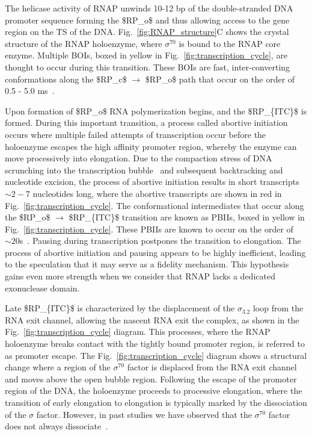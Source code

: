 The helicase activity of RNAP unwinds 10-12 \ac{bp} of the double-stranded DNA promoter sequence forming the \ac{$RP_o$} and thus allowing access to the gene region on the \ac{TS} of the DNA. 
Fig.~\ref{fig:RNAP_structure}C shows the crystal structure of the RNAP holoenzyme, where $\sigma^{70}$ is bound to the RNAP core enzyme. 
Multiple \ac{BOIs}, boxed in yellow in Fig.~\ref{fig:transcription_cycle}, are thought to occur during this transition. 
These \ac{BOIs} are fast, inter-converting conformations along the \ac{$RP_c$} $\rightarrow$ \ac{$RP_o$} path that occur on the order of 0.5 - 5.0 ms~\cite{lerner_JCP_2018, robb_JMB_2013}.

Upon formation of \ac{$RP_o$} RNA polymerization begins, and the \ac{$RP_{ITC}$} is formed.
During this important transition, a process called abortive initiation occurs where multiple failed attempts of transcription occur before the holoenzyme escapes the high affinity promoter region, whereby the enzyme can move processively into elongation. 
Due to the compaction stress of DNA scrunching into the transcription bubble~\cite{kapanidis_science_2006} and subsequent backtracking and nucleotide excision, the process of abortive initiation results in short transcripts $\sim2-7$ nucleotides long, where the abortive transcripts are shown in red in Fig.~\ref{fig:transcription_cycle}.
The conformational intermediates that occur along the \ac{$RP_o$}  $\rightarrow$ \ac{$RP_{ITC}$} transition are known as \ac{PBIIs}, boxed in yellow in Fig.~\ref{fig:transcription_cycle}. 
These \ac{PBIIs} are known to occur on the order of $\sim20$s~\cite{kapanidis_science_2006,lerner_PNAS_2016,lerner_transcription_2017}.
Pausing during transcription postpones the transition to elongation.
The process of abortive initiation and pausing appears to be highly inefficient, leading to the speculation that it may serve as a fidelity mechanism. 
This hypothesis gains even more strength when we consider that RNAP lacks a dedicated exonuclease domain.

Late \ac{$RP_{ITC}$} is characterized by the displacement of the $\sigma_{3.2}$ loop from the RNA exit channel, allowing the nascent RNA exit the complex, as shown in the Fig.~\ref{fig:transcription_cycle} diagram.
This processes, where the RNAP holoenzyme breaks contact with the tightly bound promoter region, is referred to as promoter escape. 
The Fig.~\ref{fig:transcription_cycle} diagram shows a structural change where a region of the $\sigma^{70}$ factor is displaced from the RNA exit channel and moves above the open bubble region.
Following the escape of the promoter region of the DNA, the holoenzyme proceeds to processive elongation, where the transition of early elongation to elongation is typically marked by the dissociation of the $\sigma$ factor. 
However, in past studies we have observed that the $\sigma^{70}$ factor does not always dissociate~\cite{kapanidis_MolCell_2005}.

